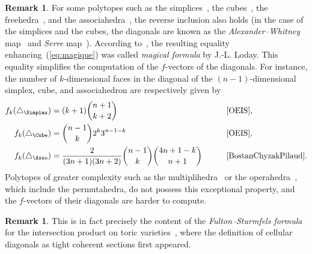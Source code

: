 \documentclass{amsart}
\newcommand{\darkblue}{\color{darkblue}} %
\theoremstyle{definition}
\newtheorem{remark}[theorem]{Remark}
\newcommand{\defn}[1]{\textsl{\darkblue #1}} %
\newcommand{\OEIS}[1]{\cite[{\rm \href{http://oeis.org/#1}{\texttt{#1}}}]{OEIS}}
\begin{document}
\begin{remark}
\label{rem:magicalFormula}
For some polytopes such as the simplices~\cite{EilenbergMacLane}, the cubes~\cite{Serre}, the freehedra~\cite{Saneblidze-freeLoopFibration}, and the associahedra~\cite{MasudaThomasTonksVallette}, the reverse inclusion also holds (in the case of the simplices and the cubes, the diagonals are known as the \emph{Alexander--Whitney} map~\cite{EilenbergMacLane} and \emph{Serre} map~\cite{Serre}).
According to~\cite{MasudaThomasTonksVallette}, the resulting equality enhancing~(\ref{eq:magique}) was called \defn{magical formula} by J.-L. Loday.
This equality simplifies the computation of the $f$-vectors of the diagonals.
For instance, the number of $k$-dimensional faces in the diagonal of the $(n-1)$-dimensional simplex, cube, and associahedron are respectively given by
\begin{alignat*}{2}
f_k(\triangle_{\Simplex}) & = (k+1) \binom{n+1}{k+2} && \text{\OEIS{A127717}},
\\
f_k(\triangle_{\Cube}) & = \binom{n-1}{k} 2^k 3^{n-1-k} && \text{\OEIS{A038220},}
\\
f_k(\triangle_{\Asso}) & = \frac{2}{(3n+1)(3n+2)} \binom{n-1}{k} \binom{4n+1-k}{n+1} \qquad && \text{\cite{BostanChyzakPilaud}.}
\end{alignat*}
Polytopes of greater complexity such as the multiplihedra~\cite{LaplanteAnfossiMazuir} or the operahedra~\cite{LaplanteAnfossi}, which include the permutahedra, do not possess this exceptional property, and the $f$-vectors of their diagonals are harder to compute.
\end{remark}

\begin{remark}
\label{rem:Fulton--Sturmfels}
This is in fact precisely the content of the \emph{Fulton--Sturmfels formula} for the intersection product on toric varieties~\cite[Thm.~4.2]{FultonSturmfels}, where the definition of cellular diagonals as tight coherent sections first appeared.
\end{remark}
\end{document}
